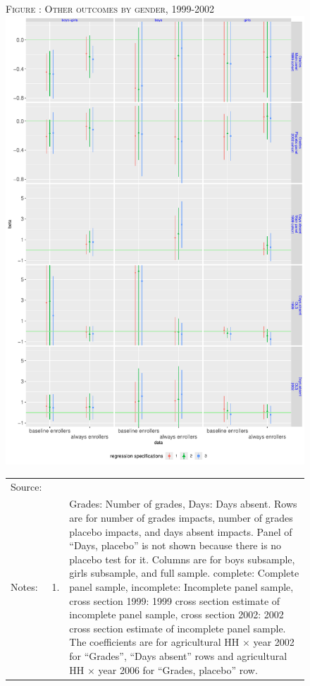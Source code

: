 \documentclass[12pt,letterpaper]{article}\usepackage[margin=1in]{geometry}
\newcommand{\0}{\ensuremath{\mbox{\boldmath $0$}}}
\begin{document}
{\begin{figure}
\hfil\textsc{\footnotesize Figure \thefigure: Other outcomes by gender, 1999-2002\label{NumGradesDaysAbsentPlots}}\\
\hfil \includegraphics[width=.7\paperwidth]{Figures/App_NumGradesDaysAbsentPlotsByGender.pdf}\\
\renewcommand{\arraystretch}{1}
\hfil\begin{tabular}{>{\hfill\scriptsize}p{1cm}<{}>{\hfill\scriptsize}p{.5cm}<{}>{\scriptsize}p{11cm}<{\hfill}}
Source: & \multicolumn{2}{l}{\scriptsize Compiled from IFPRI data.} \\[-1ex]
Notes:& 1. & Grades: Number of grades, Days: Days absent. Rows are for number of grades impacts, number of grades placebo impacts, and days absent impacts.  Panel of ``Days, placebo'' is not shown because there is no placebo test for it. Columns are for boys subsample, girls subsample, and full sample. \textsf{complete}: Complete panel sample, \textsf{incomplete}: Incomplete panel sample, \textsf{cross section 1999}: 1999 cross section estimate of incomplete panel sample, \textsf{cross section 2002}: 2002 cross section estimate of incomplete panel sample. The coefficients are for agricultural HH $\times$ year 2002 for ``Grades'', ``Days absent'' rows and agricultural HH $\times$ year 2006 for ``Grades, placebo'' row.\\[-1ex]

\end{tabular}
\end{figure}}
\end{document}
